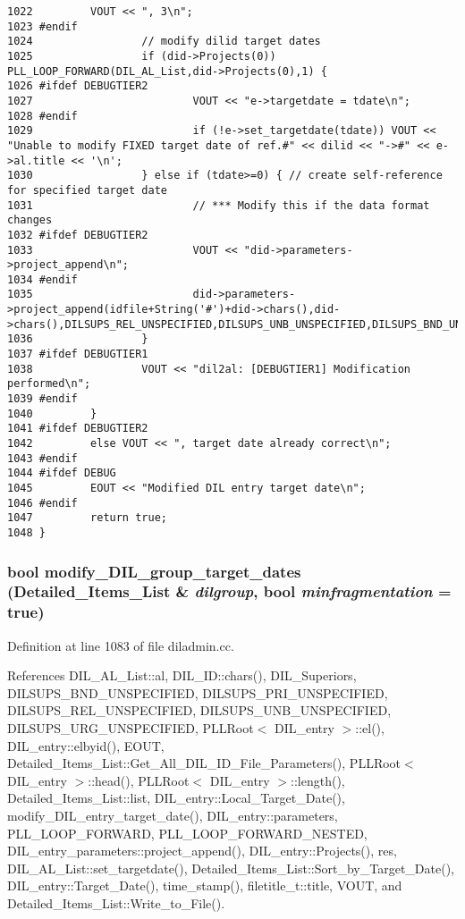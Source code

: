 \begin{verbatim}
1022         VOUT << ", 3\n";
1023 #endif
1024                 // modify dilid target dates
1025                 if (did->Projects(0)) PLL_LOOP_FORWARD(DIL_AL_List,did->Projects(0),1) {
1026 #ifdef DEBUGTIER2
1027                         VOUT << "e->targetdate = tdate\n";
1028 #endif
1029                         if (!e->set_targetdate(tdate)) VOUT << "Unable to modify FIXED target date of ref.#" << dilid << "->#" << e->al.title << '\n';
1030                 } else if (tdate>=0) { // create self-reference for specified target date
1031                         // *** Modify this if the data format changes
1032 #ifdef DEBUGTIER2
1033                         VOUT << "did->parameters->project_append\n";
1034 #endif
1035                         did->parameters->project_append(idfile+String('#')+did->chars(),did->chars(),DILSUPS_REL_UNSPECIFIED,DILSUPS_UNB_UNSPECIFIED,DILSUPS_BND_UNSPECIFIED,tdate,0,DILSUPS_URG_UNSPECIFIED,DILSUPS_PRI_UNSPECIFIED);
1036                 }
1037 #ifdef DEBUGTIER1
1038                 VOUT << "dil2al: [DEBUGTIER1] Modification performed\n";
1039 #endif
1040         }
1041 #ifdef DEBUGTIER2
1042         else VOUT << ", target date already correct\n";
1043 #endif
1044 #ifdef DEBUG
1045         EOUT << "Modified DIL entry target date\n";
1046 #endif
1047         return true;
1048 }
\end{verbatim}\normalsize 
{}
\subsubsection{\setlength{\rightskip}{0pt plus 5cm}bool modify\_\-DIL\_\-group\_\-target\_\-dates ({\bf Detailed\_\-Items\_\-List} \& {\em dilgroup}, bool {\em minfragmentation} = {\bf true})}\label{diladmin_8cc_a17}




Definition at line 1083 of file diladmin.cc.

References DIL\_\-AL\_\-List::al, DIL\_\-ID::chars(), DIL\_\-Superiors, DILSUPS\_\-BND\_\-UNSPECIFIED, DILSUPS\_\-PRI\_\-UNSPECIFIED, DILSUPS\_\-REL\_\-UNSPECIFIED, DILSUPS\_\-UNB\_\-UNSPECIFIED, DILSUPS\_\-URG\_\-UNSPECIFIED, PLLRoot$<$ DIL\_\-entry $>$::el(), DIL\_\-entry::elbyid(), EOUT, Detailed\_\-Items\_\-List::Get\_\-All\_\-DIL\_\-ID\_\-File\_\-Parameters(), PLLRoot$<$ DIL\_\-entry $>$::head(), PLLRoot$<$ DIL\_\-entry $>$::length(), Detailed\_\-Items\_\-List::list, DIL\_\-entry::Local\_\-Target\_\-Date(), modify\_\-DIL\_\-entry\_\-target\_\-date(), DIL\_\-entry::parameters, PLL\_\-LOOP\_\-FORWARD, PLL\_\-LOOP\_\-FORWARD\_\-NESTED, DIL\_\-entry\_\-parameters::project\_\-append(), DIL\_\-entry::Projects(), res, DIL\_\-AL\_\-List::set\_\-targetdate(), Detailed\_\-Items\_\-List::Sort\_\-by\_\-Target\_\-Date(), DIL\_\-entry::Target\_\-Date(), time\_\-stamp(), filetitle\_\-t::title, VOUT, and Detailed\_\-Items\_\-List::Write\_\-to\_\-File().

